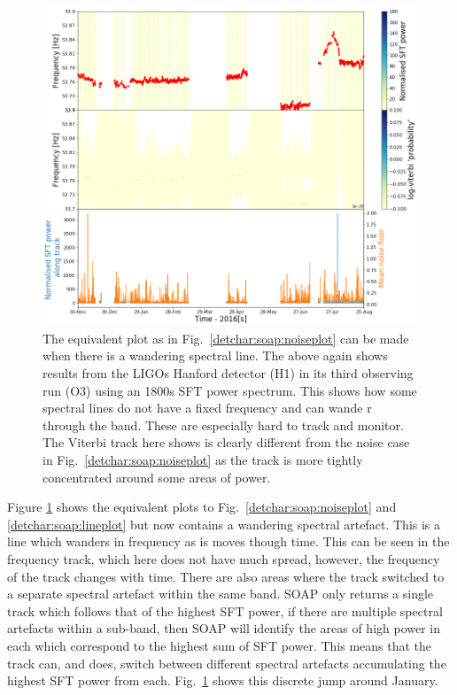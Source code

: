%
\begin{figure}[hpt]
	\centering
	\includegraphics[width=\textwidth]{C6_detchar/track_F53_7_53_9_wander.png}
        \caption[Example SOAP output for wandering line.]{The equivalent plot
as in Fig.~\ref{detchar:soap:noiseplot} can be made when there is a wandering
spectral line. The above again shows results from the \glspl{LIGO} Hanford detector
(H1) in its third observing run (O3) using an 1800s \gls{SFT} power spectrum. This
shows how some spectral lines do not have a fixed frequency and can wande r
through the band. These are especially hard to track and monitor. The Viterbi
track here shows is clearly different from the noise case in
Fig.~\ref{detchar:soap:noiseplot} as the track is more tightly concentrated
around some areas of power. } \label{detchar:soap:wanderplot}

\end{figure}
%

Figure \ref{detchar:soap:wanderplot} shows the equivalent plots to
Fig.~\ref{detchar:soap:noiseplot} and \ref{detchar:soap:lineplot} but now
contains a wandering spectral artefact.  This is
a line which wanders in
frequency as is moves though time.  This can be seen in the frequency
track, which here does not have much spread, however, the frequency of the
track changes with time.  There are also areas where the track switched to a separate spectral artefact within the same
band.  SOAP only returns a single track which follows that of the highest \gls{SFT} power, if there are multiple spectral artefacts within a sub-band, then SOAP will identify the areas of high power in each which correspond to the highest sum of \gls{SFT} power.
This means that the track can, and does, switch between different spectral artefacts accumulating the highest \gls{SFT} power from each.
Fig.~\ref{detchar:soap:wanderplot} shows this discrete jump around
January.

